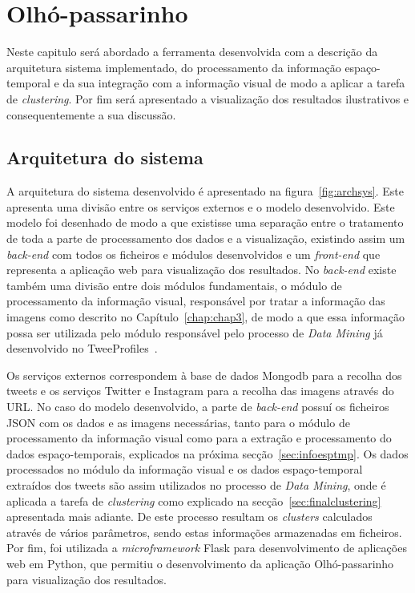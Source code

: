 \chapter{Olhó-passarinho}\label{chap:chap4}

Neste capitulo será abordado a ferramenta desenvolvida com a descrição da arquitetura sistema implementado, do processamento da informação espaço-temporal e da sua integração com a informação visual de modo a aplicar a tarefa de \textit{clustering}. Por fim será apresentado a visualização dos resultados ilustrativos e consequentemente a sua discussão. 

\section{Arquitetura do sistema}

A arquitetura do sistema desenvolvido é apresentado na figura~\ref{fig:archsys}. Este apresenta uma divisão entre os serviços externos e o modelo desenvolvido. Este modelo foi desenhado de modo a que existisse uma separação entre o tratamento de toda a parte de processamento dos dados e a visualização, existindo assim um \textit{back-end} com todos os ficheiros e módulos desenvolvidos e um \textit{front-end} que representa a aplicação web para visualização dos resultados. No \textit{back-end} existe também uma divisão entre dois módulos fundamentais, o módulo de processamento da informação visual, responsável por tratar a informação das imagens como descrito no Capítulo~\ref{chap:chap3}, de modo a que essa informação possa ser utilizada pelo módulo responsável pelo processo de \textit{Data Mining} já desenvolvido no TweeProfiles~\cite{Cunha2013}. 

Os serviços externos correspondem à base de dados Mongodb para a recolha dos tweets e os serviços Twitter e Instagram para a recolha das imagens através do URL. No caso do modelo desenvolvido, a parte de \textit{back-end} possuí os ficheiros JSON com os dados e as imagens necessárias, tanto para o módulo de processamento da informação visual como para a extração e processamento do dados espaço-temporais, explicados na próxima secção~\ref{sec:infoesptmp}. Os dados processados no módulo da informação visual e os dados espaço-temporal extraídos dos tweets são assim utilizados no processo de \textit{Data Mining}, onde é aplicada a tarefa de \textit{clustering} como explicado na secção~\ref{sec:finalclustering} apresentada mais adiante. De este processo resultam os \textit{clusters} calculados através de vários parâmetros, sendo estas informações armazenadas em ficheiros. Por fim, foi utilizada a \textit{microframework} Flask para desenvolvimento de aplicações web em Python, que permitiu o desenvolvimento da aplicação Olhó-passarinho para visualização dos resultados. 

